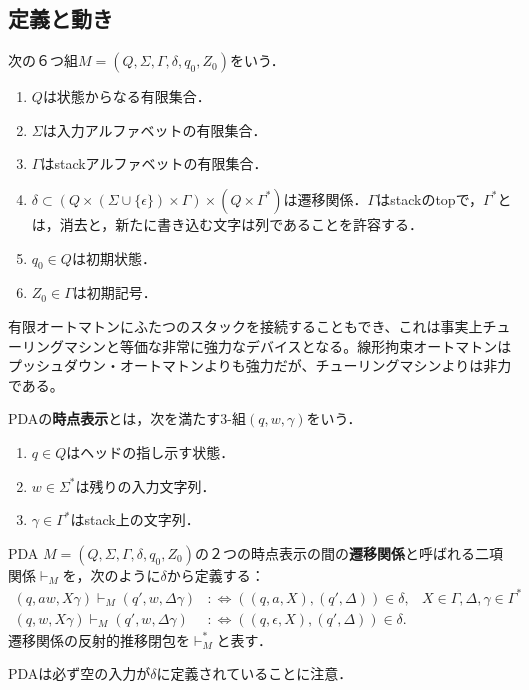 \subsection{定義と動き}

\begin{definition}
    次の６つ組$M=(Q,\Sigma,\Gamma,\delta,q_0,Z_0)$をいう．
    \begin{enumerate}
        \item $Q$は状態からなる有限集合．
        \item $\Sigma$は入力アルファベットの有限集合．
        \item $\Gamma$はstackアルファベットの有限集合．
        \item $\delta\subset(Q\times (\Sigma\cup\{\epsilon\})\times\Gamma)\times(Q\times\Gamma^*)$は遷移関係．$\Gamma$はstackのtopで，$\Gamma^*$とは，消去と，新たに書き込む文字は列であることを許容する．
        \item $q_0\in Q$は初期状態．
        \item $Z_0\in\Gamma$は初期記号．
    \end{enumerate}
\end{definition}
\begin{remark}[その他の抽象機械の設計法]
    有限オートマトンにふたつのスタックを接続することもでき、これは事実上チューリングマシンと等価な非常に強力なデバイスとなる。線形拘束オートマトンはプッシュダウン・オートマトンよりも強力だが、チューリングマシンよりは非力である。
\end{remark}

\begin{definition}
    PDAの\textbf{時点表示}とは，次を満たす3-組$(q,w,\gamma)$をいう．
    \begin{enumerate}
        \item $q\in Q$はヘッドの指し示す状態．
        \item $w\in\Sigma^*$は残りの入力文字列．
        \item $\gamma\in\Gamma^*$はstack上の文字列．
    \end{enumerate}
\end{definition}

\begin{definition}[遷移関係]
    PDA $M=(Q,\Sigma,\Gamma,\delta,q_0,Z_0)$の２つの時点表示の間の\textbf{遷移関係}と呼ばれる二項関係$\vdash_M$を，次のように$\delta$から定義する：
    \begin{align*}
        (q,aw,X\gamma)\vdash_M(q',w,\Delta\gamma)&:\Leftrightarrow((q,a,X),(q',\Delta))\in\delta,&X\in\Gamma,\Delta,\gamma\in\Gamma^*\\
        (q,w,X\gamma)\vdash_M(q',w,\Delta\gamma)&:\Leftrightarrow ((q,\epsilon,X),(q',\Delta))\in\delta.
    \end{align*}
    遷移関係の反射的推移閉包を$\vdash^*_M$と表す．
\end{definition}
\begin{remarks}
    PDAは必ず空の入力が$\delta$に定義されていることに注意．
\end{remarks}

